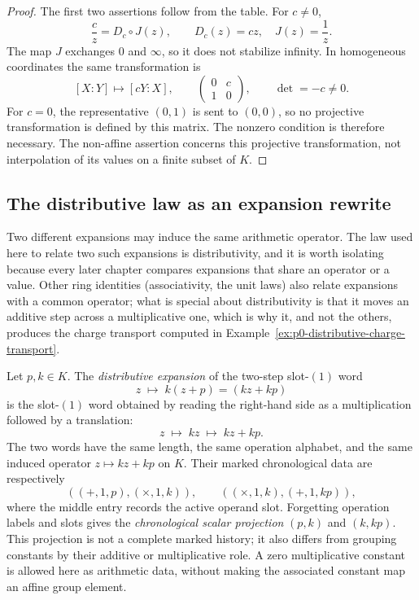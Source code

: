 \begin{proof}
The first two assertions follow from the table.  For $c\ne0$,
\[
  \frac{c}{z}=D_c\circ J(z),
  \qquad D_c(z)=cz,\quad J(z)=\frac1z.
\]
The map $J$ exchanges $0$ and $\infty$, so it does not stabilize infinity.
In homogeneous coordinates the same transformation is
\[
  [X:Y]\longmapsto[cY:X],
  \qquad
  \begin{pmatrix}0&c\\1&0\end{pmatrix},
  \qquad \det=-c\ne0.
\]
For $c=0$, the representative $(0,1)$ is sent to $(0,0)$, so no
projective transformation is defined by this matrix.  The nonzero condition
is therefore necessary.  The non-affine assertion concerns this projective
transformation, not interpolation of its values on a finite subset of $K$.
\end{proof}

\subsection{The distributive law as an expansion rewrite}
\label{subsec:p0-distributivity}

Two different expansions may induce the same arithmetic operator.  The law used
here to relate two such expansions is distributivity, and it is worth isolating
because every later chapter compares expansions that share an operator or a
value.  Other ring identities (associativity, the unit laws) also relate
expansions with a common operator; what is special about distributivity is that
it moves an additive step across a multiplicative one, which is why it, and not
the others, produces the charge transport computed in
Example~\ref{ex:p0-distributive-charge-transport}.

\begin{definition}
\label{def:p0-distributive-expansion}
Let $p,k\in K$.  The \emph{distributive expansion} of the two-step slot-$(1)$
word
\begin{equation}\label{eq:p0-distributive-expansion}
  z\;\longmapsto\;k(z+p)=(kz+kp)
\end{equation}
is the slot-$(1)$ word obtained by reading the right-hand side as a multiplication
followed by a translation:
\[
  z\;\longmapsto\;kz\;\longmapsto\;kz+kp .
\]
The two words have the same length, the same operation alphabet, and the same
induced operator $z\mapsto kz+kp$ on $K$.  Their marked chronological data
are respectively
\[
  ((+,1,p),(\times,1,k)),
  \qquad
  ((\times,1,k),(+,1,kp)),
\]
where the middle entry records the active operand slot.  Forgetting operation
labels and slots gives the \emph{chronological scalar projection}
$(p,k)$ and $(k,kp)$.  This projection is not a complete marked history;
it also differs from grouping constants by their additive or multiplicative
role.  A zero multiplicative constant is allowed here as arithmetic data,
without making the associated constant map an affine group element.
\end{definition}

